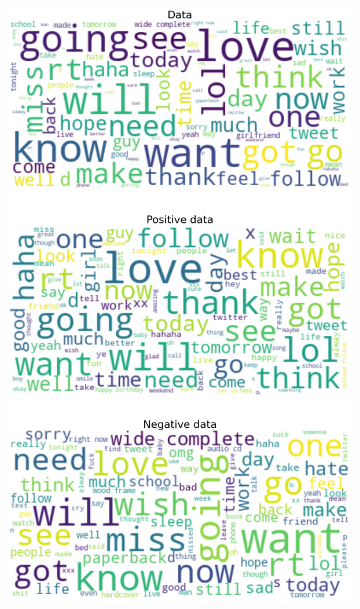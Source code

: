 \documentclass{article}
\begin{document}
\begin{itemize}
\begin{figure}[H]
\begin{subfigure}[b]{0.24\textwidth}
\includegraphics[width=\textwidth]{chapter-06/section-01-01/15/visualization/2/wordcloud.png}
\end{subfigure}
\begin{subfigure}[b]{0.24\textwidth}
\centering

\end{subfigure}
\end{figure}
\end{itemize}
\end{document}
